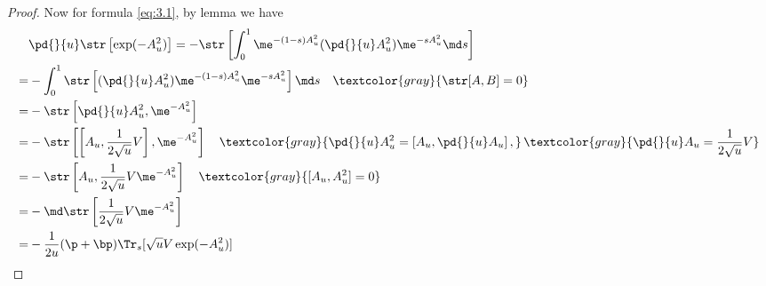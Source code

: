 \begin{proof}
    Now for formula \eqref{eq:3.1}, by lemma we have
    \begin{align*}
        &\pd{}{u}\str\left[\exp(-A_u^2)\right] = 
        -\str\left[\int_{0}^{1}\me^{-(1-s)A_u^2}(\pd{}{u}A_u^2)
        \me^{-sA_u^2}\md s\right] \\
        =&-\int_{0}^{1}\str\left[(\pd{}{u}A_u^2)\me^{-(1-s)A_u^2}
        \me^{-sA_u^2}\right]\md s \quad\textcolor{gray}{\str[A,B]=0} \\
        =&-\str\left[\pd{}{u}A_u^2,\me^{-A_u^2}\right] \\
        =&-\str\left[\left[A_u,\frac{1}{2\sqrt{u}}V\right],
        \me^{-A_u^2}\right] \quad
        \textcolor{gray}{\pd{}{u}A_u^2=\left[A_u,\pd{}{u}A_u\right],}\,
        \textcolor{gray}{\pd{}{u}A_u = \frac{1}{2\sqrt{u}}V} \\
        =&-\str\left[A_u,\frac{1}{2\sqrt{u}}V\me^{-A_u^2}\right]\quad 
        \textcolor{gray}{[A_u,A_u^2]=0} \\
        =&-\md\str\left[\frac{1}{2\sqrt{u}}V\me^{-A_u^2}\right] \\
        =&-\frac{1}{2u}(\p+\bp)\Tr_s[\sqrt{u}V\exp(-A_u^2)]
    \end{align*}


\end{proof}
